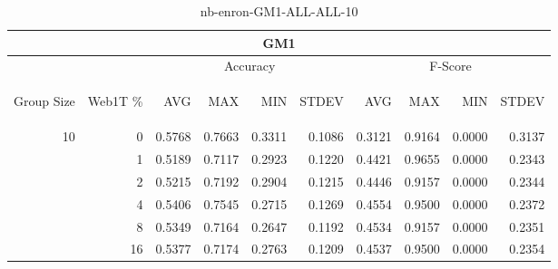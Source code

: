 \begin{center}
\begin{table}[htbp] 
 \begin{center}
\begin{tabular}{ | r | r | r | r | r | r | r | r | r | r |}
\hline
\multicolumn{10}{|c|}{GM1}\\
\hline
 & & \multicolumn{4}{|c|}{Accuracy} & \multicolumn{4}{|c|}{F-Score}\\ \cline{3-10}
\begin{sideways}Group Size\end{sideways} & \begin{sideways}Web1T \%\end{sideways} & \begin{sideways}AVG\end{sideways} & \begin{sideways}MAX\end{sideways} & \begin{sideways}MIN\end{sideways} & \begin{sideways}STDEV\end{sideways} & \begin{sideways}AVG\end{sideways} & \begin{sideways}MAX\end{sideways} & \begin{sideways}MIN\end{sideways} & \begin{sideways}STDEV\end{sideways}\\
\hline
\multirow{5}{*}{10}
 & 0 & 0.5768 & 0.7663 & 0.3311 & 0.1086 & 0.3121 & 0.9164 & 0.0000 & 0.3137\\ \cline{2-10}
 & 1 & 0.5189 & 0.7117 & 0.2923 & 0.1220 & 0.4421 & 0.9655 & 0.0000 & 0.2343\\ \cline{2-10}
 & 2 & 0.5215 & 0.7192 & 0.2904 & 0.1215 & 0.4446 & 0.9157 & 0.0000 & 0.2344\\ \cline{2-10}
 & 4 & 0.5406 & 0.7545 & 0.2715 & 0.1269 & 0.4554 & 0.9500 & 0.0000 & 0.2372\\ \cline{2-10}
 & 8 & 0.5349 & 0.7164 & 0.2647 & 0.1192 & 0.4534 & 0.9157 & 0.0000 & 0.2351\\ \cline{2-10}
 & 16 & 0.5377 & 0.7174 & 0.2763 & 0.1209 & 0.4537 & 0.9500 & 0.0000 & 0.2354\\ \cline{2-10}
\hline
\end{tabular}
\caption{nb-enron-GM1-ALL-ALL-10}
\label{table:nb-enron-GM1-ALL-ALL-10}
\end{center}
 \end{table}
\end{center}

